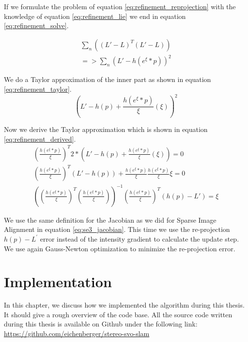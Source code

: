 \documentclass[11pt,a4paper,titlepage,oneside]{report}
\begin{document}
If we formulate the problem of equation \ref{eq:refinement_reprojection} with the knowledge of equation \ref{eq:refinement_lie} we end in equation \ref{eq:refinement_solve}.

\begin{equation}\label{eq:refinement_solve}
  \begin{gathered}
    \sum_n ((L'-L)^T(L'-L))\\
    =>\sum_n (L'-h(e^{\xi}*p))^2
  \end{gathered}
\end{equation}

We do a Taylor approximation of the inner part as shown in equation \ref{eq:refinement_taylor}.
\begin{equation}\label{eq:refinement_taylor}
  (L'-h(p)+\frac{h(e^{\xi}*p)}{\xi}(\xi))^2
\end{equation}

Now we derive the Taylor approximation which is shown in equation \ref{eq:refinement_derived}.
\begin{equation}\label{eq:refinement_derived}
  \begin{gathered}
    (\frac{h(e^{\xi}*p)}{\xi})^T2*(L'-h(p)+\frac{h(e^{\xi}*p)}{\xi}(\xi))=0\\
    (\frac{h(e^{\xi}*p)}{\xi})^T(L'-h(p))+\frac{h(e^{\xi}*p)}{\xi}\frac{h(e^{\xi}*p)}{\xi}\xi=0\\
		((\frac{h(e^{\xi}*p)}{\xi})^T(\frac{h(e^{\xi}*p)}{\xi}))^{-1}(\frac{h(e^{\xi}*p)}{\xi})^T(h(p)-L')=\xi
  \end{gathered}
\end{equation}

We use the same definition for the Jacobian as we did for Sparse Image Alignment in equation \ref{eq:se3_jacobian}. This time we use the re-projection $h(p)-L^{'}$ error instead of the intensity gradient to calculate the update step. We use again Gauss-Newton optimization to minimize the re-projection error.

\chapter{Implementation}\label{ch:implementation}
In this chapter, we discuss how we implemented the algorithm during this thesis. It should give a rough overview of the code base. All the source code written during this thesis is available on Github under the following link:\\
\url{https://github.com/eichenberger/stereo-svo-slam}
\end{document}

